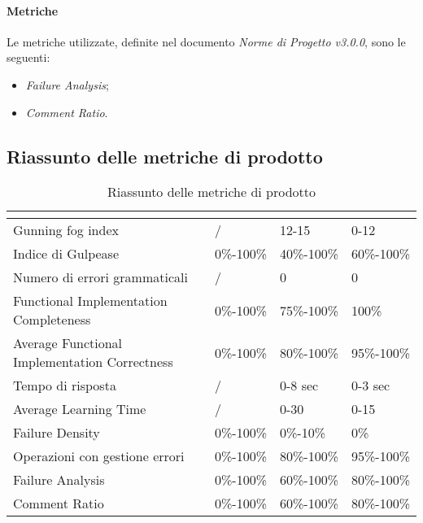 \paragraph{Metriche} \Spazio
Le metriche utilizzate, definite nel documento \emph{Norme di Progetto v3.0.0}, sono le seguenti:
	\begin{itemize}
		\item{\emph{Failure Analysis};}
		\item{\emph{Comment Ratio}.}
	\end{itemize}

\subsection{Riassunto delle metriche di prodotto}
\renewcommand{\arraystretch}{1.5}
\begin{table}[H]
	\centering
	\begin{tabular}{|C{4cm}|C{3cm}|C{3cm}|C{3cm}|}
		\hline
		\textbf{\color{title_text}{Nome Metrica}} & \textbf{\color{title_text}{Intervallo limite}} & \textbf{\color{title_text}{Range accettabile}} & \textbf{\color{title_text}{Range ottimale}} \\ \hline
		Gunning fog index & / &12-15&0-12 \\ \hline
		Indice di Gulpease & 0\%-100\%& 40\%-100\%& 60\%-100\% \\ \hline
		Numero di errori grammaticali & / & 0 & 0 \\ \hline
		Functional Implementation Completeness & 0\%-100\% & 75\%-100\% & 100\% \\ \hline
		Average Functional Implementation Correctness&0\%-100\%&80\%-100\%&95\%-100\% \\ \hline
		Tempo di risposta & / &0-8 sec & 0-3 sec \\ \hline
		Average Learning Time& / & 0-30 & 0-15 \\ \hline
		Failure Density&0\%-100\%&0\%-10\%&0\% \\ \hline
		Operazioni con gestione errori &0\%-100\%&80\%-100\%&95\%-100\% \\ \hline
		Failure Analysis&0\%-100\%&60\%-100\%&80\%-100\% \\ \hline
		Comment Ratio&0\%-100\%&60\%-100\%&80\%-100\%\\ \hline
	\end{tabular}
	\caption{Riassunto delle metriche di prodotto}
	\label{tabella:riassunto metriche di prodotto}
\end{table}
\renewcommand{\arraystretch}{1}
